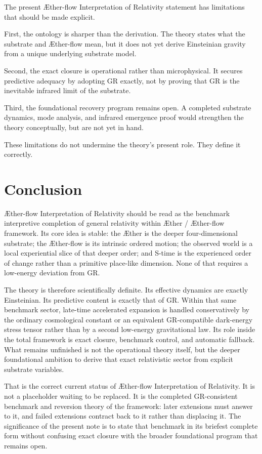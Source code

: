 \documentclass[11pt]{article}
\newcommand{\Aether}{\AE{}ther}
\newcommand{\Aflow}{\AE{}ther-flow}
\newcommand{\TheoryName}{\Aflow{} Interpretation of Relativity}
\newcommand{\TheoryProgram}{\Aether{} / \Aflow{} framework}
\begin{document}
The present \TheoryName{} statement has limitations that should be made explicit.

First, the ontology is sharper than the derivation. The theory states what the substrate and \Aflow{} mean, but it does not yet derive Einsteinian gravity from a unique underlying substrate model.

Second, the exact closure is operational rather than microphysical. It secures predictive adequacy by adopting GR exactly, not by proving that GR is the inevitable infrared limit of the substrate.

Third, the foundational recovery program remains open. A completed substrate dynamics, mode analysis, and infrared emergence proof would strengthen the theory conceptually, but are not yet in hand.

These limitations do not undermine the theory's present role. They define it correctly.

\section{Conclusion}

\TheoryName{} should be read as the benchmark interpretive completion of general relativity within \TheoryProgram{}. Its core idea is stable: the \Aether{} is the deeper four-dimensional substrate; the \Aflow{} is its intrinsic ordered motion; the observed world is a local experiential slice of that deeper order; and S-time is the experienced order of change rather than a primitive place-like dimension. None of that requires a low-energy deviation from GR.

The theory is therefore scientifically definite. Its effective dynamics are exactly Einsteinian. Its predictive content is exactly that of GR. Within that same benchmark sector, late-time accelerated expansion is handled conservatively by the ordinary cosmological constant or an equivalent GR-compatible dark-energy stress tensor rather than by a second low-energy gravitational law. Its role inside the total framework is exact closure, benchmark control, and automatic fallback. What remains unfinished is not the operational theory itself, but the deeper foundational ambition to derive that exact relativistic sector from explicit substrate variables.

That is the correct current status of \TheoryName{}. It is not a placeholder waiting to be replaced. It is the completed GR-consistent benchmark and reversion theory of the framework: later extensions must answer to it, and failed extensions contract back to it rather than displacing it. The significance of the present note is to state that benchmark in its briefest complete form without confusing exact closure with the broader foundational program that remains open.


\end{document}
